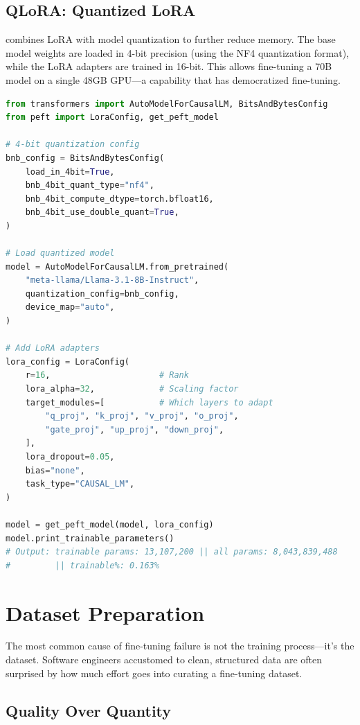 \subsection{QLoRA: Quantized LoRA}

 combines LoRA with model quantization to further reduce memory. The base model weights are loaded in 4-bit precision (using the NF4 quantization format), while the LoRA adapters are trained in 16-bit. This allows fine-tuning a 70B model on a single 48GB GPU---a capability that has democratized fine-tuning.

\begin{lstlisting}[language=Python, caption={QLoRA training setup with Hugging Face}]
from transformers import AutoModelForCausalLM, BitsAndBytesConfig
from peft import LoraConfig, get_peft_model

# 4-bit quantization config
bnb_config = BitsAndBytesConfig(
    load_in_4bit=True,
    bnb_4bit_quant_type="nf4",
    bnb_4bit_compute_dtype=torch.bfloat16,
    bnb_4bit_use_double_quant=True,
)

# Load quantized model
model = AutoModelForCausalLM.from_pretrained(
    "meta-llama/Llama-3.1-8B-Instruct",
    quantization_config=bnb_config,
    device_map="auto",
)

# Add LoRA adapters
lora_config = LoraConfig(
    r=16,                      # Rank
    lora_alpha=32,             # Scaling factor
    target_modules=[           # Which layers to adapt
        "q_proj", "k_proj", "v_proj", "o_proj",
        "gate_proj", "up_proj", "down_proj",
    ],
    lora_dropout=0.05,
    bias="none",
    task_type="CAUSAL_LM",
)

model = get_peft_model(model, lora_config)
model.print_trainable_parameters()
# Output: trainable params: 13,107,200 || all params: 8,043,839,488
#         || trainable%: 0.163%
\end{lstlisting}

\section{Dataset Preparation}
\label{sec:dataset-prep}

The most common cause of fine-tuning failure is not the training process---it's the dataset. Software engineers accustomed to clean, structured data are often surprised by how much effort goes into curating a fine-tuning dataset.

\subsection{Quality Over Quantity}

